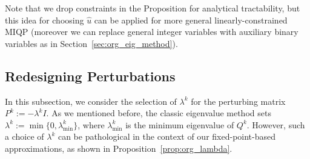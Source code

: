 \documentclass[]{article}
\begin{document}
Note that we drop constraints in the Proposition for analytical tractability, but this idea for choosing $\hat u$ can be applied for more general linearly-constrained MIQP (moreover we can replace general integer variables with auxiliary binary variables as in Section~\ref{sec:org_eig_method}). 

\subsection{Redesigning Perturbations} \label{sec:matrix_select}

In this subsection, we consider the selection of $\lambda^k$ for the perturbing matrix $P^k:=-\lambda^k I$. As we mentioned before, the classic eigenvalue method \cite{hammer1970some} sets $\lambda^k :=\min\{0,\lambda_{\min}^k\}$, where $\lambda_{\min}^k$ is the minimum eigenvalue of $Q^k$. However, such a choice of $\lambda^k$ can be pathological in the context of our fixed-point-based approximations, as shown in Proposition~\ref{prop:org_lambda}.
\end{document}
